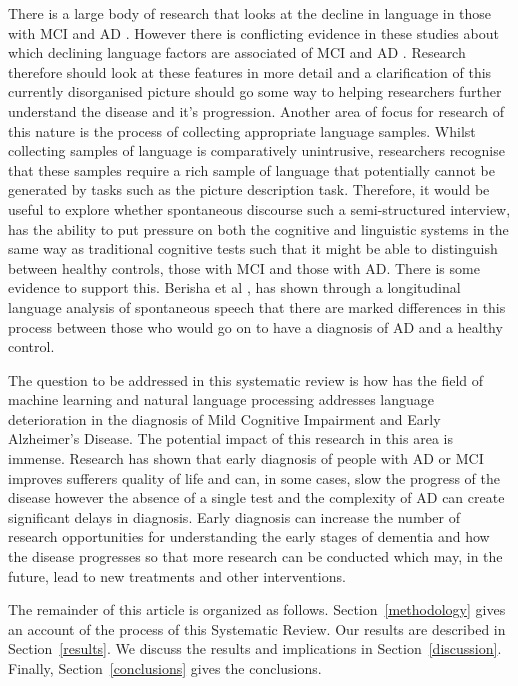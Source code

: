 \documentclass[12pt]{article}
\begin{document}
There is a large body of research that looks at the decline in language in those with MCI and AD \cite{Taler2008, Boschi2017}. However there is conflicting evidence in these studies about which declining language factors are associated of MCI and AD \cite{Taler2008, Boschi2017}. Research therefore should look at these features in more detail and a clarification of this currently disorganised picture should go some way to helping researchers further understand the disease and it's progression. Another area of focus for research of this nature is the process of collecting appropriate language samples. Whilst collecting samples of language is comparatively unintrusive, researchers recognise that these samples require a rich sample of language that potentially cannot be generated by tasks such as the picture description task. Therefore, it would be useful to explore whether spontaneous discourse such a semi-structured interview, has the ability to put pressure on both the cognitive and linguistic systems in the same way as traditional cognitive tests such that it might be able to distinguish between healthy controls, those with MCI and those with AD. There is some evidence to support this. Berisha et al \cite{Berisha2015}, has shown through a longitudinal language analysis of spontaneous speech that there are marked differences in this process between those who would go on to have a diagnosis of AD and a healthy control. 
\par
The question to be addressed in this systematic review is how has the field of machine learning and natural language processing addresses language deterioration in the diagnosis of Mild Cognitive Impairment and Early Alzheimer's Disease. The potential impact of this research in this area is immense. Research has shown that early diagnosis of people with AD or MCI improves sufferers quality of life and can, in some cases, slow the progress of the disease however the absence of a single test and the complexity of AD can create significant delays in diagnosis. Early diagnosis can increase the number of research opportunities for understanding the early stages of dementia and how the disease progresses so that more research can be conducted which may, in the future, lead to new treatments and other interventions.
\par 
The remainder of this article is organized as follows. Section~\ref{methodology} gives an account of the process of this Systematic Review. Our results are described in Section~\ref{results}. We discuss the results and implications in Section~\ref{discussion}. Finally, Section~\ref{conclusions} gives the conclusions.
\end{document}
